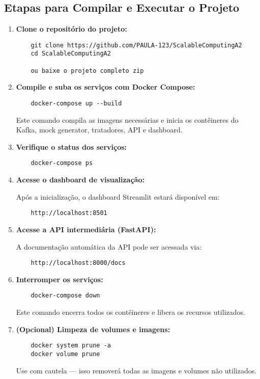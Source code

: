 \documentclass[a4paper,12pt]{article}
\begin{document}
\subsection*{Etapas para Compilar e Executar o Projeto}

\begin{enumerate}
    \item \textbf{Clone o repositório do projeto:}
    \begin{verbatim}
    git clone https://github.com/PAULA-123/ScalableComputingA2
    cd ScalableComputingA2

    ou baixe o projeto completo zip
    \end{verbatim}

    \item \textbf{Compile e suba os serviços com Docker Compose:}
    \begin{verbatim}
    docker-compose up --build
    \end{verbatim}

    Este comando compila as imagens necessárias e inicia os contêineres do Kafka, mock generator, tratadores, API e dashboard.

    \item \textbf{Verifique o status dos serviços:}
    \begin{verbatim}
    docker-compose ps
    \end{verbatim}

    \item \textbf{Acesse o dashboard de visualização:}

    Após a inicialização, o dashboard Streamlit estará disponível em:
    \begin{verbatim}
    http://localhost:8501
    \end{verbatim}

    \item \textbf{Acesse a API intermediária (FastAPI):}

    A documentação automática da API pode ser acessada via:
    \begin{verbatim}
    http://localhost:8000/docs
    \end{verbatim}

    \item \textbf{Interromper os serviços:}
    \begin{verbatim}
    docker-compose down
    \end{verbatim}

    Este comando encerra todos os contêineres e libera os recursos utilizados.

    \item \textbf{(Opcional) Limpeza de volumes e imagens:}
    \begin{verbatim}
    docker system prune -a
    docker volume prune
    \end{verbatim}
    Use com cautela — isso removerá todas as imagens e volumes não utilizados.
\end{enumerate}
\end{document}
